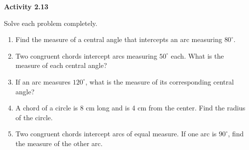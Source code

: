 \vspace{0.3ex}
\noindent\textbf{Activity 2.13}

\vspace{0.2ex}

Solve each problem completely.
\begin{enumerate}
    \item Find the measure of a central angle that intercepts an arc measuring $80^\circ$.
    \item Two congruent chords intercept arcs measuring $50^\circ$ each. What is the measure of each central angle?
    \item If an arc measures $120^\circ$, what is the measure of its corresponding central angle?
    \item A chord of a circle is 8 cm long and is 4 cm from the center. Find the radius of the circle.
    \item Two congruent chords intercept arcs of equal measure. If one arc is $90^\circ$, find the measure of the other arc.
\end{enumerate}
